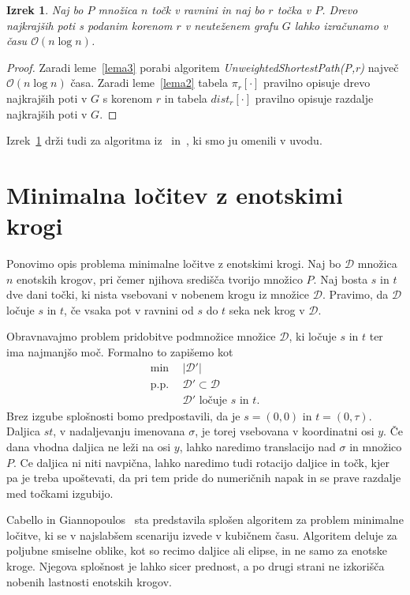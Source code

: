\documentclass[a4paper, 12pt]{book}
\newcommand{\D}{\ensuremath{\mathcal{D}}}
\newcommand{\OO}{\ensuremath{\mathcal{O}}} %
\newtheorem{izrek}{Izrek}[chapter]
\begin{document}
\begin{izrek}
\label{ssspIzrek}
Naj bo $P$ množica $n$ točk v ravnini in naj bo $r$ točka v $P$. Drevo najkrajših poti s podanim korenom $r$ v neuteženem grafu $G$ lahko izračunamo v času $\OO(n\log n)$.
\end{izrek}

\begin{proof}
Zaradi leme~\ref{lema3} porabi algoritem \textit{UnweightedShortestPath(P,r)} največ $\OO(n\log n)$ časa. Zaradi leme~\ref{lema2} tabela $\pi_r[\cdot]$ pravilno opisuje drevo najkrajših poti v $G$ s korenom $r$ in tabela $dist_r[\cdot]$ pravilno opisuje razdalje najkrajših poti v $G$.
\end{proof}
\afterpage{\FloatBarrier}

Izrek~\ref{ssspIzrek} drži tudi za algoritma iz~\cite{ChanS16} in~\cite{eik-01}, ki smo ju omenili v uvodu.

\section{Minimalna ločitev z enotskimi krogi}
Ponovimo opis problema minimalne ločitve z enotskimi krogi.
Naj bo $\D$ množica $n$ enotskih krogov, pri čemer njihova središča tvorijo množico $P$. Naj bosta $s$ in $t$ dve dani točki, ki nista vsebovani v nobenem krogu iz množice $\D$. Pravimo, da $\D$ ločuje $s$ in $t$, če vsaka pot v ravnini od $s$ do $t$ seka nek krog v $\D$.

Obravnavajmo problem pridobitve podmnožice mno\-ži\-ce $\D$, ki ločuje $s$ in $t$ ter ima najmanjšo moč. Formalno to zapišemo kot 
\begin{align*}
	\min ~~		& |\D'|\\
	 \mbox{p.p.}~~ & \D'\subset \D\\
				&	\D'\text{ ločuje $s$ in $t$}. 
\end{align*}
Brez izgube splošnosti bomo predpostavili, da je $s=(0,0)$ in $t=(0,\tau)$. Daljica $st$, v nadaljevanju imenovana $\sigma$, je torej vsebovana v koordinatni osi $y$. Če dana vhodna daljica ne leži na osi $y$, lahko naredimo translacijo nad $\sigma$ in množico $P$. Ce daljica ni niti navpična, lahko naredimo tudi rotacijo daljice in točk, kjer pa je treba upoštevati, da pri tem pride do numeričnih napak in se prave razdalje med točkami izgubijo. 

Cabello in Giannopoulos~\cite{CG16} sta predstavila splošen algoritem za problem minimalne ločitve, ki se v najslabšem scenariju izvede v kubičnem času. Algoritem deluje za poljubne smiselne oblike, kot so recimo daljice ali elipse, in ne samo za enotske kroge. Njegova splošnost je lahko sicer prednost, a po drugi strani ne izkorišča nobenih lastnosti enotskih krogov.
\end{document}
